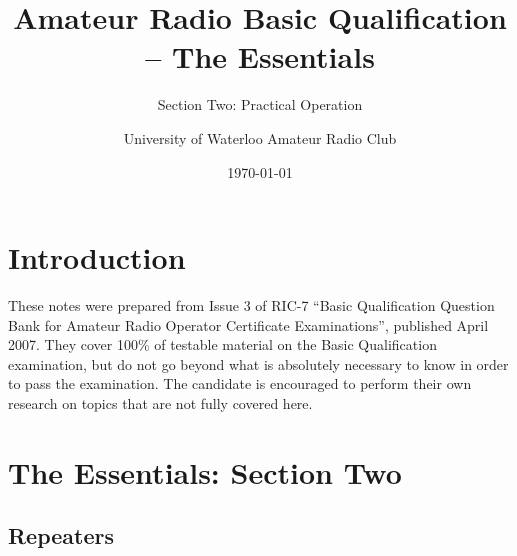 \documentclass[letterpaper,12pt]{scrartcl}
\title{Amateur Radio Basic Qualification -- The Essentials}
\subtitle{Section Two: Practical Operation}
\author{University of Waterloo Amateur Radio Club}
\date{\today}
\begin{document}
\maketitle
\tableofcontents

\section{Introduction}

These notes were prepared from Issue 3 of RIC-7 ``Basic Qualification Question Bank for Amateur Radio Operator Certificate Examinations'', published April 2007.
They cover 100\% of testable material on the Basic Qualification examination, but do not go beyond what is absolutely necessary to know in order to pass the examination.
The candidate is encouraged to perform their own research on topics that are not fully covered here.

\section{The Essentials: Section Two}

\subsection{Repeaters}
\end{document}
